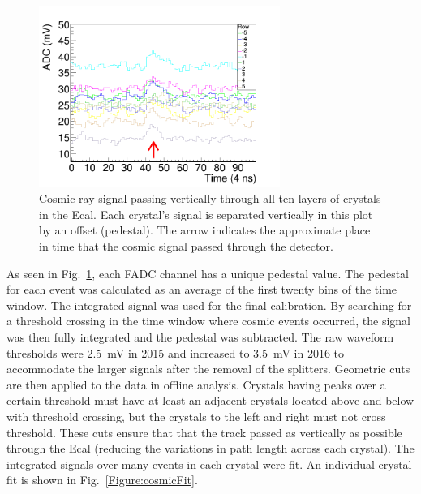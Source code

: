 \begin{figure}[H]
  \centering
      \includegraphics[width=0.7\textwidth]{pics/performance/cosmicSignal.png}
  \caption[Real cosmic ray signal in raw FADC waveform passing vertically through Ecal]{Cosmic ray signal passing vertically through all ten layers of crystals in the Ecal. Each crystal's signal is separated vertically in this plot by an offset (pedestal). The arrow indicates the approximate place in time that the cosmic signal passed through the detector.}
  \label{Figure:cosmicSig}
\end{figure}

As seen in Fig.~\ref{Figure:cosmicSig}, each FADC channel has a unique pedestal value. The pedestal for each event was calculated as an average of the first twenty bins of the time window. The integrated signal was used for the final calibration. By searching for a threshold crossing in the time window where cosmic events occurred, the signal was then fully integrated and the pedestal was subtracted. The raw waveform thresholds were 2.5~mV in 2015 and increased to 3.5~mV in 2016 to accommodate the larger signals after the removal of the splitters. Geometric cuts are then applied to the data in offline analysis. Crystals having peaks over a certain threshold must have at least an adjacent crystals located above and below with threshold crossing, but the crystals to the left and right must not cross threshold. These cuts ensure that that the track passed as vertically as possible through the Ecal (reducing the variations in path length across each crystal). The integrated signals over many events in each crystal were fit. An individual crystal fit is shown in Fig.~\ref{Figure:cosmicFit}.

